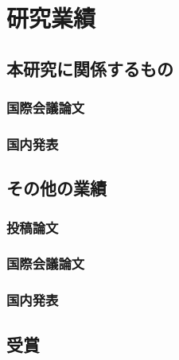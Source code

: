 \chapter*{研究業績}
\section*{本研究に関係するもの}
	
	\subsection*{国際会議論文}
	
	\subsection*{国内発表}
		
\section*{その他の業績}
	\subsection*{投稿論文}
%		
	\subsection*{国際会議論文}
		
	\subsection*{国内発表}
\section*{受賞}
